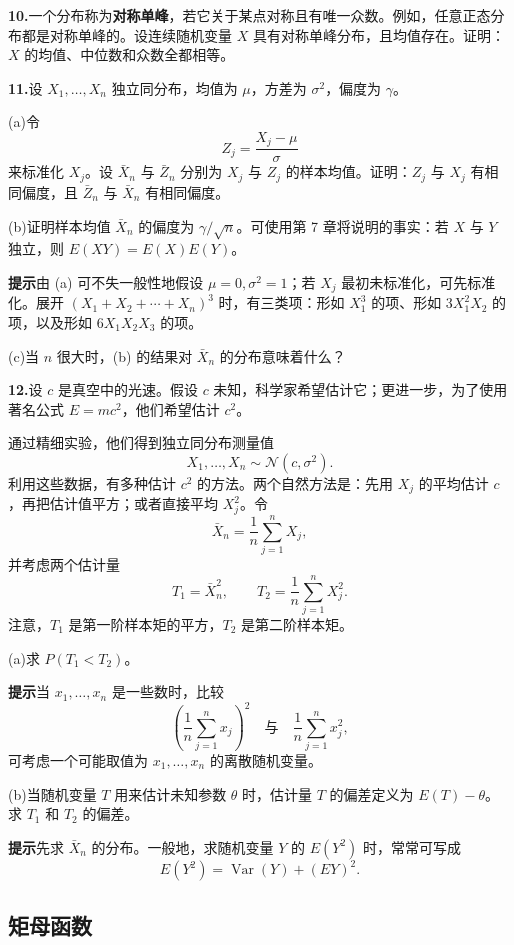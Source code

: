 \documentclass[UTF8,12pt,a4paper,fontset=fandol]{ctexart}
\begin{document}
\noindent\textbf{10.}\quad 一个分布称为\textbf{对称单峰}，若它关于某点对称且有唯一众数。例如，任意正态分布都是对称单峰的。设连续随机变量 $X$ 具有对称单峰分布，且均值存在。证明：$X$ 的均值、中位数和众数全都相等。

\noindent\textbf{11.}\quad 设 $X_1,\ldots,X_n$ 独立同分布，均值为 $\mu$，方差为 $\sigma^2$，偏度为 $\gamma$。

\noindent (a)\quad 令
\[
  Z_j=\frac{X_j-\mu}{\sigma}
\]
来标准化 $X_j$。设 $\bar X_n$ 与 $\bar Z_n$ 分别为 $X_j$ 与 $Z_j$ 的样本均值。证明：$Z_j$ 与 $X_j$ 有相同偏度，且 $\bar Z_n$ 与 $\bar X_n$ 有相同偏度。

\noindent (b)\quad 证明样本均值 $\bar X_n$ 的偏度为 $\gamma/\sqrt n$。可使用第 7 章将说明的事实：若 $X$ 与 $Y$ 独立，则 $E(XY)=E(X)E(Y)$。

\noindent\textbf{提示}\quad 由 (a) 可不失一般性地假设 $\mu=0,\sigma^2=1$；若 $X_j$ 最初未标准化，可先标准化。展开 $(X_1+X_2+\cdots+X_n)^3$ 时，有三类项：形如 $X_1^3$ 的项、形如 $3X_1^2X_2$ 的项，以及形如 $6X_1X_2X_3$ 的项。

\noindent (c)\quad 当 $n$ 很大时，(b) 的结果对 $\bar X_n$ 的分布意味着什么？

\noindent\textbf{12.}\quad 设 $c$ 是真空中的光速。假设 $c$ 未知，科学家希望估计它；更进一步，为了使用著名公式 $E=mc^2$，他们希望估计 $c^2$。

通过精细实验，他们得到独立同分布测量值
\[
  X_1,\ldots,X_n\sim\mathcal{N}(c,\sigma^2).
\]
利用这些数据，有多种估计 $c^2$ 的方法。两个自然方法是：先用 $X_j$ 的平均估计 $c$，再把估计值平方；或者直接平均 $X_j^2$。令
\[
  \bar X_n=\frac1n\sum_{j=1}^n X_j,
\]
并考虑两个估计量
\[
  T_1=\bar X_n^2,\qquad
  T_2=\frac1n\sum_{j=1}^nX_j^2.
\]
注意，$T_1$ 是第一阶样本矩的平方，$T_2$ 是第二阶样本矩。

\noindent (a)\quad 求 $P(T_1<T_2)$。

\noindent\textbf{提示}\quad 当 $x_1,\ldots,x_n$ 是一些数时，比较
\[
  \left(\frac1n\sum_{j=1}^n x_j\right)^2
  \quad\text{与}\quad
  \frac1n\sum_{j=1}^n x_j^2,
\]
可考虑一个可能取值为 $x_1,\ldots,x_n$ 的离散随机变量。

\noindent (b)\quad 当随机变量 $T$ 用来估计未知参数 $\theta$ 时，估计量 $T$ 的偏差定义为 $E(T)-\theta$。求 $T_1$ 和 $T_2$ 的偏差。

\noindent\textbf{提示}\quad 先求 $\bar X_n$ 的分布。一般地，求随机变量 $Y$ 的 $E(Y^2)$ 时，常常可写成
\[
  E(Y^2)=\operatorname{Var}(Y)+(EY)^2.
\]

\subsection*{矩母函数}
\end{document}
